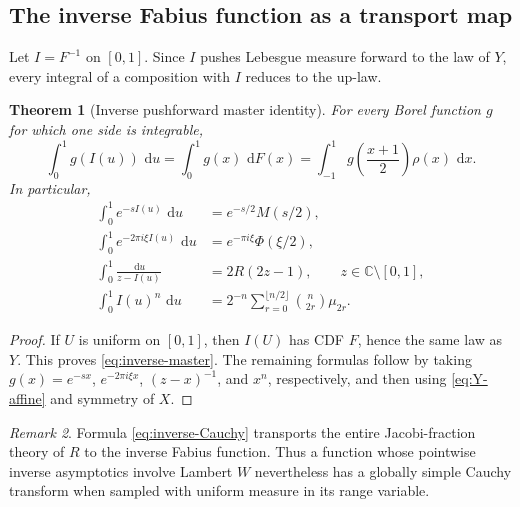 \documentclass[11pt]{article}
\newtheorem{theorem}{Theorem}[section]
\theoremstyle{definition}
\theoremstyle{remark}
\newtheorem{remark}[theorem]{Remark}
\newcommand{\C}{\mathbb C}
\newcommand{\dd}{\,\mathrm d}
\begin{document}
\subsection{The inverse Fabius function as a transport map}

Let \(I=F^{-1}\) on \([0,1]\).  Since \(I\) pushes Lebesgue measure forward to the law
of \(Y\), every integral of a composition with \(I\) reduces to the up-law.

\begin{theorem}[Inverse pushforward master identity]\label{thm:inverse-pushforward}
For every Borel function \(g\) for which one side is integrable,
\begin{equation}
 \boxed{
 \int_0^1g(I(u))\,\dd u
 =\int_0^1g(x)\,\dd F(x)
 =\int_{-1}^{1}g\!\left(\frac{x+1}{2}\right)\rho(x)\,\dd x.
 }                                                           \label{eq:inverse-master}
\end{equation}
In particular,
\begin{align}
 \int_0^1 e^{-sI(u)}\,\dd u
 &=e^{-s/2}M(s/2),                                           \label{eq:inverse-Laplace}\\
 \int_0^1 e^{-2\pi i\xi I(u)}\,\dd u
 &=e^{-\pi i\xi}\Phi(\xi/2),                              \label{eq:inverse-Fourier}\\
 \int_0^1\frac{\dd u}{z-I(u)}
 &=2R(2z-1),\qquad z\in\C\setminus[0,1],                   \label{eq:inverse-Cauchy}\\
 \int_0^1I(u)^n\,\dd u
 &=2^{-n}\sum_{r=0}^{\lfloor n/2\rfloor}
   \binom{n}{2r}\mu_{2r}.                                   \label{eq:inverse-moments}
\end{align}
\end{theorem}

\begin{proof}
If \(U\) is uniform on \([0,1]\), then \(I(U)\) has CDF \(F\), hence the same law as
\(Y\).  This proves \eqref{eq:inverse-master}.  The remaining formulas follow by taking
\(g(x)=e^{-sx}\), \(e^{-2\pi i\xi x}\), \((z-x)^{-1}\), and \(x^n\), respectively,
and then using \eqref{eq:Y-affine} and symmetry of \(X\).
\end{proof}

\begin{remark}
Formula \eqref{eq:inverse-Cauchy} transports the entire Jacobi-fraction theory of \(R\) to
the inverse Fabius function.  Thus a function whose pointwise inverse asymptotics involve
Lambert \(W\) nevertheless has a globally simple Cauchy transform when sampled with
uniform measure in its range variable.
\end{remark}
\end{document}
